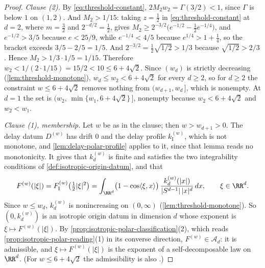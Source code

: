 \begin{proof}
\leanok
\emph{Clause (2).} By \ref{eq:threshold-constant}, $2M_2 w_2 = \Gamma(3/2) < 1$, since $\Gamma$
is below $1$ on $(1,2)$. And $M_2 > 1/15$: taking $z = \tfrac12$ in
\ref{eq:threshold-constant} at $d = 2$, where $m = \tfrac32$ and $2^{-d/2} = \tfrac12$, gives
$M_2 \ge 2^{-3/2}\bigl(e^{-1/2} - \tfrac12 e^{-1/4}\bigr)$, and
$e^{-1/2} > 3/5$ because $e < 25/9$, while $e^{-1/4} < 4/5$ because $e^{1/4} > 1 + \tfrac14$, so
the bracket exceeds $3/5 - 2/5 = 1/5$. And $2^{-3/2} = \tfrac12\sqrt{1/2} > 1/3$ because
$\sqrt{1/2} > 2/3$. Hence $M_2 > 1/3 \cdot 1/5 = 1/15$. Therefore
$w_2 < 1/(2 \cdot 1/15) = 15/2 < 10 \le 6 + 4\sqrt2$. Since
$(w_d)$ is strictly decreasing (\ref{lem:threshold-monotone}), $w_d \le w_2 < 6+4\sqrt2$ for every
$d \ge 2$, so for $d \ge 2$ the constraint $w \le 6+4\sqrt2$ removes nothing from
$(w_{d+1},w_d\,]$, which is nonempty. At $d = 1$ the set is
$(w_2,\,\min\{w_1, 6+4\sqrt2\}\,]$, nonempty because $w_2 < 6+4\sqrt2$ and $w_2 < w_1$.

\emph{Clause (1), membership.} Let $w$ be as in the clause; then $w > w_{d+1} > 0$. The delay datum $D^{(w)}$ has
drift $0$ and the delay profile $k^{(w)}_{\mathrm I}$, which is not monotone, and
\ref{lem:delay-polar-profile} applies to it, since that lemma reads no monotonicity. It gives that
$k^{(w)}_d$ is finite and satisfies the two integrability conditions of
\ref{def:isotropic-origin-datum}, and that
\[
  F^{(w)}(|\xi|) = F^{(w)}_{\mathrm I}\bigl(\tfrac12|\xi|^2\bigr)
   = \int_{\RR^d}\bigl(1 - \cos\langle\xi,x\rangle\bigr)\,
     \frac{k^{(w)}_d(|x|)}{|S^{d-1}|\,|x|^d}\,dx , \qquad \xi \in \RR^d .
\]
Since $w \le w_d$, $k^{(w)}_d$ is nonincreasing on $(0,\infty)$ (\ref{lem:threshold-monotone}). So
$(0,k^{(w)}_d)$ is an isotropic origin datum in dimension $d$ whose exponent is
$\xi \mapsto F^{(w)}(|\xi|)$. By \ref{prop:isotropic-polar-classification}(2), which reads
\ref{prop:isotropic-polar-reading}(1) in its converse direction, $F^{(w)} \in \mathcal{A}_d$: it
is admissible, and $\xi \mapsto F^{(w)}(|\xi|)$ is the exponent of a self-decomposable law on
$\RR^d$. (For $w \le 6 + 4\sqrt2$ the admissibility is also .)


\end{proof}
